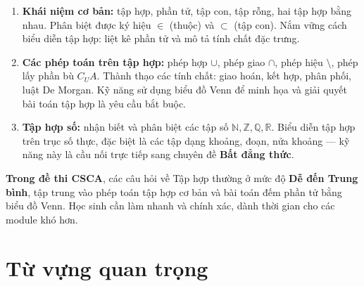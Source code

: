 \documentclass[12pt, a4paper]{report}
\begin{document}
\begin{enumerate}
  \item \textbf{Khái niệm cơ bản:} tập hợp, phần tử, tập con, tập rỗng, hai tập hợp bằng nhau. Phân biệt được ký hiệu \(\in\) (thuộc) và \(\subset\) (tập con). Nắm vững cách biểu diễn tập hợp: liệt kê phần tử và mô tả tính chất đặc trưng.

  \item \textbf{Các phép toán trên tập hợp:} phép hợp \(\cup\), phép giao \(\cap\), phép hiệu \(\setminus\), phép lấy phần bù \(C_U A\). Thành thạo các tính chất: giao hoán, kết hợp, phân phối, luật De Morgan. Kỹ năng sử dụng biểu đồ Venn để minh họa và giải quyết bài toán tập hợp là yêu cầu bắt buộc.

  \item \textbf{Tập hợp số:} nhận biết và phân biệt các tập số \(\mathbb{N}, \mathbb{Z}, \mathbb{Q}, \mathbb{R}\). Biểu diễn tập hợp trên trục số thực, đặc biệt là các tập dạng khoảng, đoạn, nửa khoảng — kỹ năng này là cầu nối trực tiếp sang chuyên đề \textbf{Bất đẳng thức}.
\end{enumerate}

\textbf{Trong đề thi CSCA}, các câu hỏi về Tập hợp thường ở mức độ \textbf{Dễ đến Trung bình}, tập trung vào phép toán tập hợp cơ bản và bài toán đếm phần tử bằng biểu đồ Venn. Học sinh cần làm nhanh và chính xác, dành thời gian cho các module khó hơn.

\section{Từ vựng quan trọng}
\end{document}

